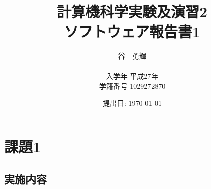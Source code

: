 \documentclass[a4j]{jarticle}
\begin{document}
\title{計算機科学実験及演習2 \\ \bf ソフトウェア報告書1}
\author{谷　勇輝 \\ \\入学年 平成27年 \\ 学籍番号 1029272870}
\date{提出日: \today} %
\maketitle

\section{課題1}
\subsection{実施内容}
\end{document}
